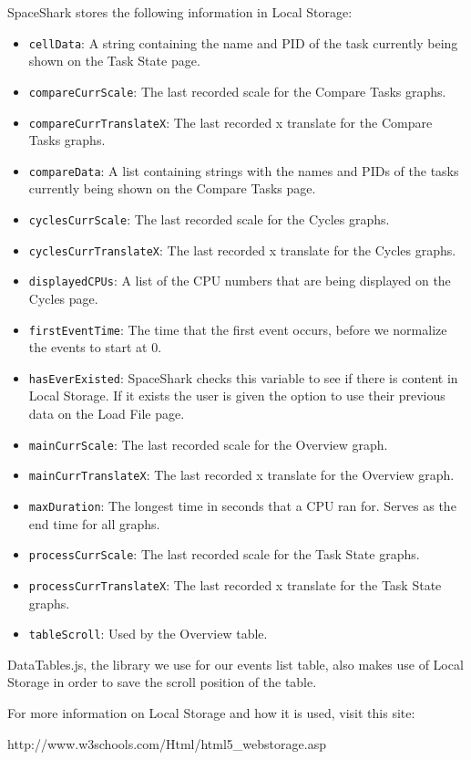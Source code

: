 \documentclass{hmcclinic}
\begin{document}
  SpaceShark stores the following information in Local Storage:

\begin{itemize}
  \item \texttt{cellData}: A string containing the name and PID of the task currently being
  shown on the Task State page. 
\item \texttt{compareCurrScale}: The last recorded scale for the Compare Tasks graphs.
\item \texttt{compareCurrTranslateX}: The last recorded x translate for the Compare Tasks
  graphs.
\item \texttt{compareData}: A list containing strings with the names and PIDs of the
  tasks currently being shown on the Compare Tasks page.
\item \texttt{cyclesCurrScale}: The last recorded scale for the Cycles graphs.	
\item \texttt{cyclesCurrTranslateX}: The last recorded x translate for the Cycles graphs.
\item \texttt{displayedCPUs}: A list of the CPU numbers that are being displayed on the
  Cycles page.
\item \texttt{firstEventTime}: The time that the first event occurs, before we
  normalize the events to start at 0.
\item \texttt{hasEverExisted}: SpaceShark checks this variable to see if there
  is content in Local Storage. If it exists the user is given the option to use
  their previous data on the Load File page.	
\item \texttt{mainCurrScale}: The last recorded scale for the Overview graph.	
\item \texttt{mainCurrTranslateX}: The last recorded x translate for the Overview graph.
\item \texttt{maxDuration}: The longest time in seconds that a CPU ran for. Serves as
  the end time for all graphs.
\item \texttt{processCurrScale}: The last recorded scale for the Task State graphs.
\item \texttt{processCurrTranslateX}: The last recorded x translate for the Task State
  graphs.
\item \texttt{tableScroll}: Used by the Overview table.
\end{itemize}
DataTables.js, the library we use for our events list table,  also makes use of Local Storage in order to save the scroll position of the table.

For more information on Local Storage and how it is used, visit this site:
\begin{center}
http://www.w3schools.com/Html/html5\_webstorage.asp
\end{center}
\end{document}
